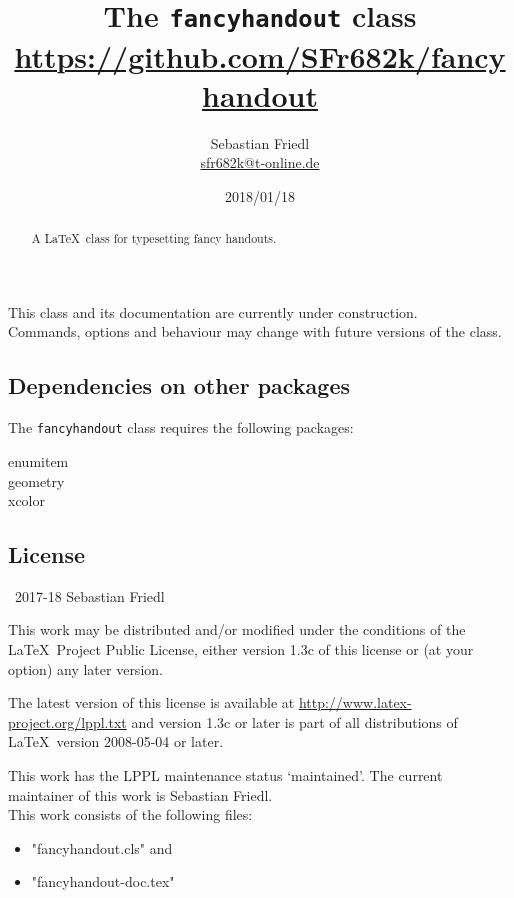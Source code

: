 \documentclass[11pt]{ltxdoc}
\title{The \texttt{fancyhandout} class \\ {\large\url{https://github.com/SFr682k/fancyhandout}}}
\author{Sebastian Friedl \\ \href{mailto:sfr682k@t-online.de}{\ttfamily sfr682k@t-online.de}}
\date{2018/01/18}
\begin{document}
	\maketitle
	
	\begin{abstract}
		\noindent%
		A \LaTeX\ class for typesetting fancy handouts.
	\end{abstract}
	
	This class and its documentation are currently under construction. \\
	Commands, options and behaviour may change with future versions of the class.
	
	\tableofcontents
	\clearpage
	
	
	
	\subsection*{Dependencies on other packages}
	The \texttt{fancyhandout} class requires the following packages:
	\begin{multicols}{3}\ttfamily\centering
		enumitem \\ geometry \\ xcolor
	\end{multicols}
	
	\subsection*{License}
	\begin{small}
		\textcopyright\ 2017-18 Sebastian Friedl
		
		\smallskip
		This work may be distributed and/or modified under the conditions of the \LaTeX\ Project Public License, either version 1.3c of this license or (at your option) any later version.
		
		\smallskip
		The latest version of this license is available at \url{http://www.latex-project.org/lppl.txt} and version 1.3c or later is part of all distributions of \LaTeX\ version 2008-05-04 or later.
		
		\smallskip
		This work has the LPPL maintenance status \enquote*{maintained}. The current maintainer of this work is Sebastian Friedl. \\
		This work consists of the following files:
		\begin{itemize} \itemsep 0pt
			\item "fancyhandout.cls" and
			\item "fancyhandout-doc.tex"
		\end{itemize}
	\end{small}
\end{document}
